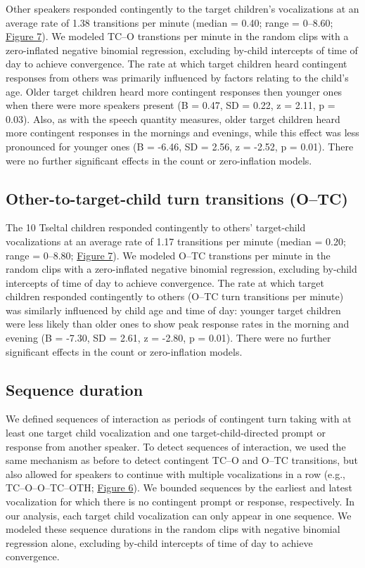 \documentclass[floatsintext,man]{apa6}
\theoremstyle{definition}
\theoremstyle{definition}
\theoremstyle{definition}
\theoremstyle{remark}
\begin{document}
Other speakers responded contingently to the target children's
vocalizations at an average rate of 1.38 transitions per minute (median
= 0.40; range = 0--8.60; \protect\hyperlink{fig7}{Figure 7}). We modeled
TC--O transtions per minute in the random clips with a zero-inflated
negative binomial regression, excluding by-child intercepts of time of
day to achieve convergence. The rate at which target children heard
contingent responses from others was primarily influenced by factors
relating to the child's age. Older target children heard more contingent
responses then younger ones when there were more speakers present (B =
0.47, SD = 0.22, z = 2.11, p = 0.03). Also, as with the speech quantity
measures, older target children heard more contingent responses in the
mornings and evenings, while this effect was less pronounced for younger
ones (B = -6.46, SD = 2.56, z = -2.52, p = 0.01). There were no further
significant effects in the count or zero-inflation models.

\subsection{Other-to-target-child turn transitions
(O--TC)}\label{other-to-target-child-turn-transitions-otc}

The 10 Tseltal children responded contingently to others' target-child
vocalizations at an average rate of 1.17 transitions per minute (median
= 0.20; range = 0--8.80; \protect\hyperlink{fig7}{Figure 7}). We modeled
O--TC transtions per minute in the random clips with a zero-inflated
negative binomial regression, excluding by-child intercepts of time of
day to achieve convergence. The rate at which target children responded
contingently to others (O--TC turn transitions per minute) was similarly
influenced by child age and time of day: younger target children were
less likely than older ones to show peak response rates in the morning
and evening (B = -7.30, SD = 2.61, z = -2.80, p = 0.01). There were no
further significant effects in the count or zero-inflation models.

\subsection{Sequence duration}\label{sequence-duration}

We defined sequences of interaction as periods of contingent turn taking
with at least one target child vocalization and one
target-child-directed prompt or response from another speaker. To detect
sequences of interaction, we used the same mechanism as before to detect
contingent TC--O and O--TC transitions, but also allowed for speakers to
continue with multiple vocalizations in a row (e.g., TC--O--O--TC--OTH;
\protect\hyperlink{fig6}{Figure 6}). We bounded sequences by the
earliest and latest vocalization for which there is no contingent prompt
or response, respectively. In our analysis, each target child
vocalization can only appear in one sequence. We modeled these sequence
durations in the random clips with negative binomial regression alone,
excluding by-child intercepts of time of day to achieve convergence.
\end{document}
